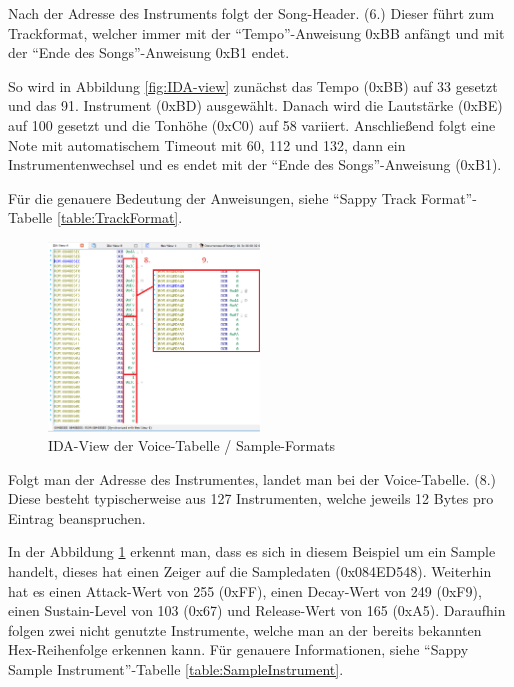 \documentclass[11pt,a4paper]{scrartcl}
\begin{document}
Nach der Adresse des Instruments folgt der Song-Header. (6.) Dieser f\"uhrt zum Trackformat, welcher immer mit der \enquote{Tempo}-Anweisung 0xBB anf\"angt und mit der \enquote{Ende des Songs}-Anweisung 0xB1 endet. 

So wird in Abbildung \ref{fig:IDA-view} zun\"achst das Tempo (0xBB) auf 33 gesetzt und das 91. Instrument (0xBD) ausgew\"ahlt. Danach wird die Lautst\"arke (0xBE) auf 100 gesetzt und die Tonh\"ohe (0xC0) auf 58 variiert. Anschlie{\ss}end folgt eine Note mit automatischem Timeout mit 60, 112 und 132, dann ein Instrumentenwechsel und es endet mit der \enquote{Ende des Songs}-Anweisung (0xB1). 

F\"ur die genauere Bedeutung der Anweisungen, siehe \enquote{Sappy Track Format}-Tabelle \ref{table:TrackFormat}.

\begin{figure}
    \centering
    \vspace{-5mm}
    \includegraphics[width=0.5\textwidth]{Sampleformat}
	\caption{IDA-View der Voice-Tabelle / Sample-Formats}
	\label{fig:Sampleformat}
\end{figure}

Folgt man der Adresse des Instrumentes, landet man bei der Voice-Tabelle. (8.) Diese besteht typischerweise aus 127 Instrumenten, welche jeweils 12 Bytes pro Eintrag beanspruchen.

In der Abbildung \ref{fig:Sampleformat} erkennt man, dass es sich in diesem Beispiel um ein Sample handelt, dieses hat einen Zeiger auf die Sampledaten (0x084ED548). Weiterhin hat es einen Attack-Wert von 255 (0xFF), einen Decay-Wert von 249 (0xF9), einen Sustain-Level von 103 (0x67) und Release-Wert von 165 (0xA5). Daraufhin folgen zwei nicht genutzte Instrumente, welche man an der bereits bekannten Hex-Reihenfolge erkennen kann.
F\"ur genauere Informationen, siehe \enquote{Sappy Sample Instrument}-Tabelle \ref{table:SampleInstrument}.
\end{document}
